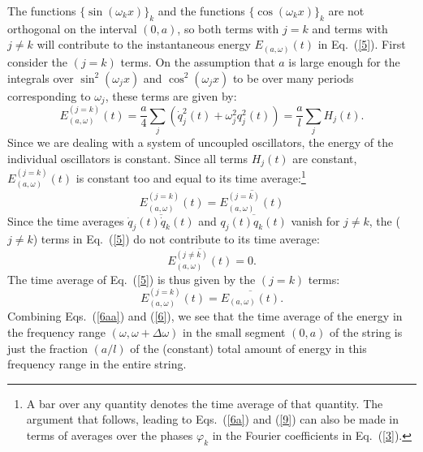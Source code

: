 \documentclass{elsart}
\begin{document}
The functions $\{ \sin{(\omega_k x)} \}_k$ and the functions $\{ \cos{(\omega_k x)} \}_k$ are not orthogonal on the interval $(0,a)$, so both terms with $j=k$ and terms with $j \neq k$ will contribute to the instantaneous energy $E_{(a, \omega)}(t)$ in Eq.\ (\ref{5}). First consider the  $(j=k)$ terms. On the assumption that $a$ is large enough for the integrals over $\sin^2{(\omega_j x)}$ and $ \cos^2{(\omega_j x)}$ to be over many periods corresponding to $\omega_j$, these terms are given by:
\begin{equation}
E_{(a, \omega)}^{(j=k)}(t) = 
\frac{a}{4} \sum_{j}  \left( \dot{q}_j^2(t) + \omega_j^2  q_j^2(t) \right) =  \frac{a}{l} \sum_{j} H_j(t).
\label{6aa}
\end{equation}
Since we are dealing with a system of uncoupled oscillators, the energy of the individual oscillators is constant. Since all terms $H_j(t)$ are constant, $E_{(a, \omega)}^{(j=k)}(t)$ is constant too and equal to its time average:\footnote{A bar over any quantity denotes the time average of that quantity. The argument that follows, leading to Eqs.\ (\ref{6a}) and (\ref{9}) can also be made in terms of averages over the phases $\varphi_k$ in the Fourier coefficients in Eq.\ (\ref{3}). }
\begin{equation}
E_{(a, \omega)}^{(j=k)}(t) = \overline{ E_{(a, \omega)}^{(j=k)}(t) }
\label{6a}
\end{equation}
Since the time averages $\overline{\dot{q}_j(t) \dot{q}_k(t) }$ and $\overline{q_j(t) q_k(t)}$ vanish for $j \neq k$, the ($j \neq k$) terms in Eq.\ (\ref{5}) do not contribute to its time average:
\begin{equation}
\overline{ E_{(a, \omega)}^{(j \neq k)}(t) } = 0.
\label{6ac}
\end{equation}
The time average of Eq.\ (\ref{5}) is thus given by the $(j=k)$ terms:
\begin{equation}
E_{(a, \omega)}^{(j=k)}(t) = \overline{E_{(a, \omega)}(t)}.
\label{6}
\end{equation}
Combining Eqs.\ (\ref{6aa}) and (\ref{6}), we see that the time average of the energy in the frequency range $(\omega, \omega + \Delta \omega)$ in the small segment $(0,a)$ of the string is just the fraction $(a/l)$ of the (constant) total amount of energy in this frequency range  in the entire string.
\end{document}

